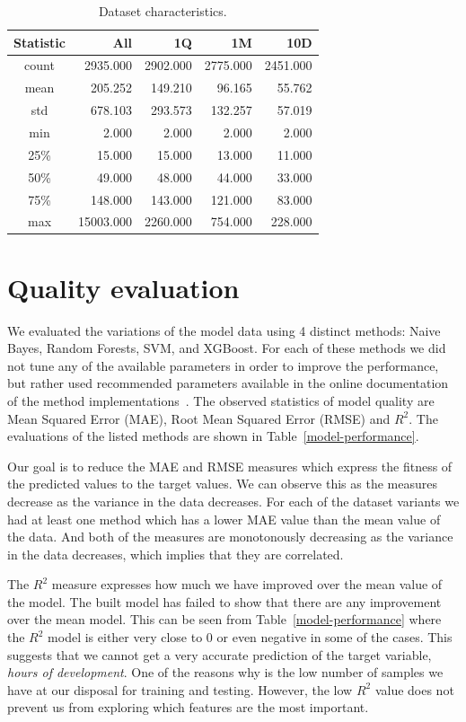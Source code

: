 \documentclass[conference,compsoc]{IEEEtran}
\begin{document}
\begin{table}[!t]
	\caption{Dataset characteristics. }
	\label{dataset-description}
	\centering
	\begin{tabular}{c|r|r|r|r}
		Statistic &        All  & 1Q & 1M & 10D \\
		\hline
		count &  2935.000  &     2902.000  &   2775.000 &   2451.000 \\
		mean  &   205.252  &      149.210  &     96.165 &     55.762 \\
		std   &   678.103  &      293.573  &    132.257 &     57.019 \\
		min   &     2.000  &        2.000  &      2.000 &      2.000 \\
		25\%   &    15.000  &       15.000  &     13.000 &     11.000 \\
		50\%   &    49.000  &       48.000  &     44.000 &     33.000 \\
		75\%   &   148.000  &      143.000  &    121.000 &     83.000 \\
		max   & 15003.000  &     2260.000  &    754.000 &    228.000 \\
	\end{tabular}
\end{table}


\section{Quality evaluation}
We evaluated the variations of the model data using 4 distinct methods: Naive Bayes, Random Forests, SVM, and XGBoost. For each of these methods we did not tune any of the available parameters in order to improve the performance, but rather used recommended parameters available in the online documentation of the method implementations~\cite{chen2016xgboost, scikit-learn}. The observed statistics of model quality are Mean Squared Error (MAE), Root Mean Squared Error (RMSE) and $R^2$. The evaluations of the listed methods are shown in Table~\ref{model-performance}.

Our goal is to reduce the MAE and RMSE measures which express the fitness of the predicted values to the target values. We can observe this as the measures decrease as the variance in the data decreases. For each of the dataset variants we had at least one method which has a lower MAE value than the mean value of the data. And both of the measures are monotonously decreasing as the variance in the data decreases, which implies that they are correlated.

The $R^2$ measure expresses how much we have improved over the mean value of the model. The built model has failed to show that there are any improvement over the mean model. This can be seen from Table~\ref{model-performance} where the $R^2$ model is either very close to $0$ or even negative in some of the cases. This suggests that we cannot get a very accurate prediction of the target variable, \textit{hours of development}. One of the reasons why is the low number of samples we have at our disposal for training and testing. However, the low $R^2$ value does not prevent us from exploring which features are the most important.
\end{document}
